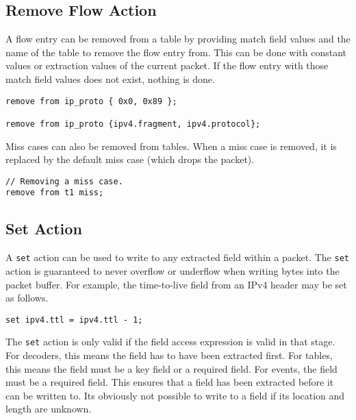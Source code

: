 \subsection{Remove Flow Action} \label{tut:remove_flow_action}

A flow entry can be removed from a table by providing match field values and the
name of the table to remove the flow entry from. This can be done with constant
values or extraction values of the current packet. If the flow entry with
those match field values does not exist, nothing is done.

\begin{codepage}
\begin{lstlisting}
remove from ip_proto { 0x0, 0x89 };

remove from ip_proto {ipv4.fragment, ipv4.protocol};
\end{lstlisting}
\end{codepage}

Miss cases can also be removed from tables. When a miss case is removed, it is
replaced by the default miss case (which drops the packet).

\begin{codepage}
\begin{lstlisting}
// Removing a miss case.
remove from t1 miss;
\end{lstlisting}
\end{codepage}

\subsection{Set Action} \label{tut:set_action}

A \texttt{set} action can be used to write to any extracted field within a
packet. 
The \texttt{set} action is guaranteed to never overflow or underflow when
writing bytes into the packet buffer.
For example, the time-to-live field from an IPv4 header may be set as
follows.

\begin{codepage}
\begin{lstlisting}
set ipv4.ttl = ipv4.ttl - 1;
\end{lstlisting}
\end{codepage}

The \texttt{set} action is only valid if the field access expression is valid in
that stage. For decoders, this means the field has to have been extracted first.
For tables, this means the field must be a key field or a required field. For
events, the field must be a required field. This ensures that a field
has been extracted before it can be written to. Its obviously not possible
to write to a field if its location and length are unknown.

